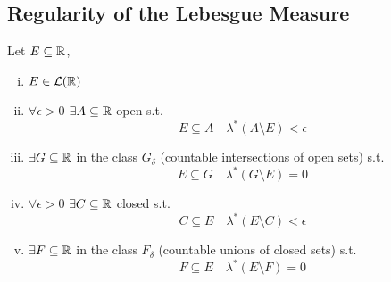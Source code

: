 \subsection{Regularity of the Lebesgue Measure}
Let $E\subseteq\mathbb{R}$, \tfae
\begin{enumerate}[i)]
    \item\label{LebReg:1} $E\in\mathcal{L}(\mathbb{R})$
    \item\label{LebReg:2} $\forall \epsilon >0$ $\exists A \subseteq \mathbb{R}$ open s.t.
          \[
              E\subseteq A \quad \lambda^*(A\setminus E) < \epsilon
          \]
    \item\label{LebReg:3} $\exists G \subseteq \mathbb{R}$ in the class $G_{\delta}$ (countable intersections of open sets) s.t.
          \[
              E\subseteq G \quad \lambda^*(G\setminus E)=0
          \]
    \item\label{LebReg:4} $\forall \epsilon >0$ $\exists C \subseteq \mathbb{R}$ closed s.t.
          \[
              C\subseteq E \quad \lambda^*(E\setminus C) < \epsilon
          \]
    \item\label{LebReg:5} $\exists F \subseteq \mathbb{R}$ in the class $F_{\delta}$ (countable unions of closed sets) s.t.
          \[
              F\subseteq E \quad \lambda^*(E\setminus F)=0
          \]
\end{enumerate}
